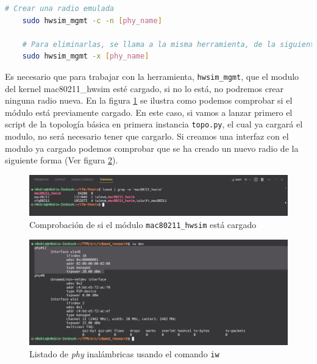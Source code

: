 \begin{lstlisting}[language= bash, style=Consola, caption={Operativa básica de la herramienta hwsim\_mgmt},label=code:hwsim]
    # Crear una radio emulada
    sudo hwsim_mgmt -c -n [phy_name]

    # Para eliminarlas, se llama a la misma herramienta, de la siguiente manera
    sudo hwsim_mgmt -x [phy_name]
\end{lstlisting}
\vspace{0.5cm}

Es necesario que para trabajar con la herramienta, \texttt{hwsim\_mgmt}, que el modulo del kernel mac80211\_hwsim esté cargado, si no lo está, no podremos crear ninguna radio nueva. En la figura \ref{fig:debugBOFUSS_2} se ilustra como podemos comprobar si el módulo está previamente cargado. En este caso, si vamos a lanzar primero el script de la topología básica en primera instancia \texttt{topo.py},  el cual ya cargará el modulo, no será necesario tener que cargarlo. Si creamos una interfaz con el modulo ya cargado podemos comprobar que se ha creado un nuevo radio de la siguiente forma (Ver figura \ref{fig:debugBOFUSS_3}).

\begin{figure}[ht!]
    \centering
    \includegraphics[width=\textwidth]{archivos/img/analisis/debugBOFUSS_2.png}
    \caption{Comprobación de si el módulo \texttt{mac80211\_hwsim} está cargado}
    \label{fig:debugBOFUSS_2}
\end{figure}

\begin{figure}[ht!]
    \centering
    \includegraphics[width=\textwidth]{archivos/img/analisis/debugBOFUSS_3.png}
    \caption{Listado de \textit{phy} inalámbricas usando el comando \texttt{iw}}
    \label{fig:debugBOFUSS_3}
\end{figure}


